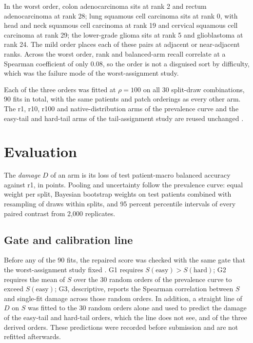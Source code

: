 \documentclass[11pt]{article}
\begin{document}
In the worst order, colon adenocarcinoma sits at rank 2 and rectum adenocarcinoma at rank 28; lung squamous cell carcinoma sits at rank 0, with head and neck squamous cell carcinoma at rank 19 and cervical squamous cell carcinoma at rank 29; the lower-grade glioma sits at rank 5 and glioblastoma at rank 24. The mild order places each of these pairs at adjacent or near-adjacent ranks. Across the worst order, rank and balanced-arm recall correlate at a Spearman coefficient of only 0.08, so the order is not a disguised sort by difficulty, which was the failure mode of the worst-assignment study.

Each of the three orders was fitted at $\rho=100$ on all 30 split-draw combinations, 90 fits in total, with the same patients and patch orderings as every other arm. The r1, r10, r100 and native-distribution arms of the prevalence curve and the easy-tail and hard-tail arms of the tail-assignment study are reused unchanged \citep{queisler2026prevalenceTcga, queisler2026tailTcga}.

\section{Evaluation}
\label{sec:evaluation}
The \emph{damage} $D$ of an arm is its loss of test patient-macro balanced accuracy against r1, in points. Pooling and uncertainty follow the prevalence curve: equal weight per split, Bayesian bootstrap weights on test patients \citep{rubin1981bayesian} combined with resampling of draws within splits, and 95 percent percentile intervals of every paired contrast from 2,000 replicates.

\subsection{Gate and calibration line}
\label{sec:gate}
Before any of the 90 fits, the repaired score was checked with the same gate that the worst-assignment study fixed \citep{queisler2026worstTcga}. G1 requires $S(\text{easy}) > S(\text{hard})$; G2 requires the mean of $S$ over the 30 random orders of the prevalence curve to exceed $S(\text{easy})$; G3, descriptive, reports the Spearman correlation between $S$ and single-fit damage across those random orders. In addition, a straight line of $D$ on $S$ was fitted to the 30 random orders alone and used to predict the damage of the easy-tail and hard-tail orders, which the line does not see, and of the three derived orders. These predictions were recorded before submission and are not refitted afterwards.
\end{document}
